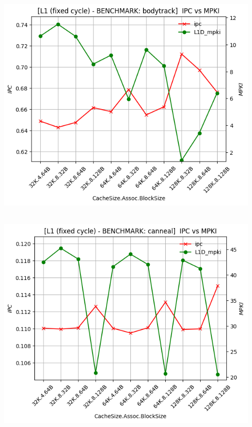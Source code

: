 \begin{minipage}{\textwidth}
    \begin{center}
        \\
        \vspace{3mm}
        \includegraphics[scale=0.70]{graphs/L1/fixed/bodytrack.png}
        \vspace{6mm}
    \end{center}
\end{minipage}

\begin{minipage}{\textwidth}
    \begin{center}
        \\
        \vspace{3mm}
        \includegraphics[scale=0.70]{graphs/L1/fixed/canneal.png}
        \vspace{6mm}
    \end{center}
\end{minipage}

